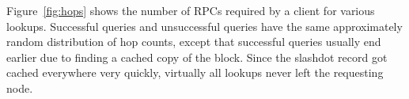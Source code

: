 Figure~\ref{fig:hops} shows the number of RPCs required
by a client for various lookups.
Successful queries and unsuccessful queries have the same
approximately random distribution of hop counts, except
that successful queries usually end earlier due to finding
a cached copy of the block.
Since the slashdot record got cached everywhere very quickly,
virtually all lookups never left the requesting node.






